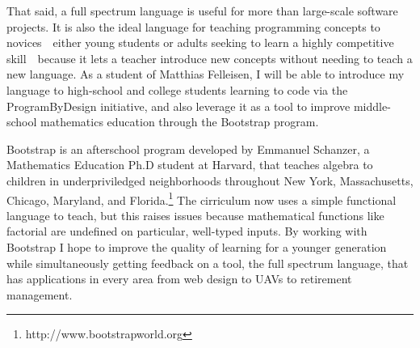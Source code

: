 \documentclass[12pt]{article}
\begin{document}
That said, a full spectrum language is useful for more than large-scale software projects.
It is also the ideal language for teaching programming concepts to novices~\textemdash~either young students or adults seeking to learn a highly competitive skill~\textemdash~because it lets a teacher introduce new concepts without needing to teach a new language.
As a student of Matthias Felleisen, I will be able to introduce my language to high-school and college students learning to code via the ProgramByDesign initiative, and also leverage it as a tool to improve middle-school mathematics education through the Bootstrap program.

Bootstrap is an afterschool program developed by Emmanuel Schanzer, a Mathematics Education Ph.D student at Harvard, that teaches algebra to children in underpriviledged neighborhoods throughout New York, Massachusetts, Chicago, Maryland, and Florida.\footnote{http://www.bootstrapworld.org}
The cirriculum now uses a simple functional language to teach, but this raises issues because mathematical functions like factorial are undefined on particular, well-typed inputs.
By working with Bootstrap I hope to improve the quality of learning for a younger generation while simultaneously getting feedback on a tool, the full spectrum language, that has applications in every area from web design to UAVs to retirement management.

\renewcommand{\section}[2]{}
\begin{multicols}{2}
\footnotesize


\end{multicols}
\end{document}
